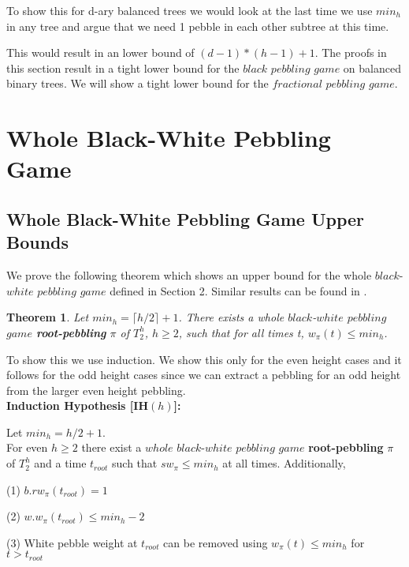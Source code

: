 \documentclass[12pt]{article}
\newtheorem{theorem}{Theorem}[subsection]
\newcommand{\troot}{t_{root}}
\begin{document}
To show this for d-ary balanced trees we would look at the last time we use $min_h$ in any tree and argue that we need 1 pebble in each other subtree at this time. 

This would result in an lower bound of $(d-1) * (h-1) + 1$. The proofs in this section result in a tight lower bound for the $black$ $pebbling$ $game$ on balanced binary trees. We will show a tight lower bound for the $fractional $ $pebbling$ $game$.


\newpage




\section{Whole Black-White Pebbling Game} 

\subsection{Whole Black-White Pebbling Game Upper Bounds} 

We prove the following theorem which shows an upper bound for the whole $black$-$white$ $pebbling$ $game$ defined in Section 2. Similar results can be found in \cite{c:pebjournal}.

\begin{theorem}
Let  $min_h = \lceil h/2\rceil + 1$.
There exists a whole $black$-$white$ $pebbling$ $game$ {\bf root-pebbling} $\pi$ of $T^h_2$, $h \geq 2$, such
that for all times t, $w_\pi(t) \le min_h$.
\end{theorem}

\noindent
To show this we use induction. We show this only for the even height cases and it follows for the odd height cases since we can extract a pebbling for an odd height from the larger even height pebbling.\\

\noindent
{\bf Induction Hypothesis [IH$(h)$]:} 

\noindent
Let $min_h = h/2 + 1$.\\
For even $h\geq 2$
there exist a $whole$ $black$-$white$ $pebbling$ $game$ {\bf root-pebbling} $\pi$ of $T_2^h$ and a time $\troot$ such that $sw_\pi \leq min_h$ at all times. Additionally,

(1) $b.rw_\pi(\troot) = 1$

(2) $w.w_\pi(\troot) \leq min_h-2$

(3) White pebble weight at $\troot$ can be removed using $w_\pi(t) \leq min_h$ for  $t > \troot$\\
\end{document}
